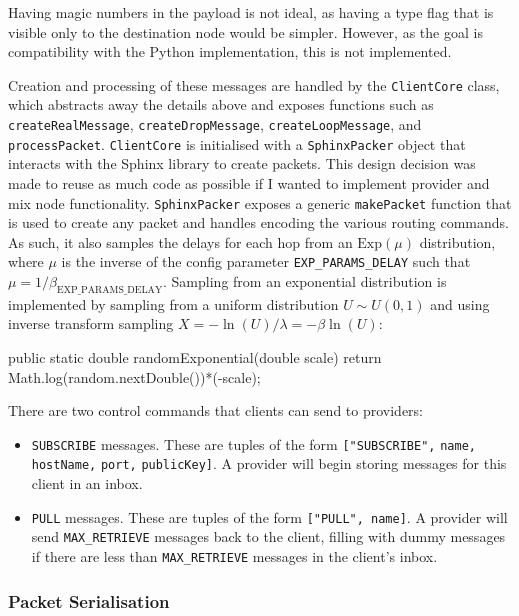 \documentclass[final,dissertation.tex]{subfiles}
\begin{document}
Having magic numbers in the payload is not ideal, as having a type flag that is visible only to the destination node would be simpler. However, as the goal is compatibility with the Python implementation, this is not implemented.

Creation and processing of these messages are handled by the \verb|ClientCore| class, which abstracts away the details above and exposes functions such as \verb|createRealMessage|, \verb|createDropMessage|, \verb|createLoopMessage|, and \verb|processPacket|.  \verb|ClientCore| is initialised with a \verb|SphinxPacker| object that interacts with the Sphinx library to create packets. This design decision was made to reuse as much code as possible if I wanted to implement provider and mix node functionality. \verb|SphinxPacker| exposes a generic \verb|makePacket| function that is used to create any packet and handles encoding the various routing commands. As such, it also samples the delays for each hop from an $\text{Exp}(\mu)$ distribution, where $\mu$ is the inverse of the config parameter \verb|EXP_PARAMS_DELAY| such that $\mu = 1/\beta_\text{EXP\_PARAMS\_DELAY}$. Sampling from an exponential distribution is implemented by sampling from a uniform distribution $U \sim U(0,1)$ and using inverse transform sampling $X = -\ln(U)/\lambda = -\beta\ln(U)$:

\begin{javacode}
public static double randomExponential(double scale) {
    return Math.log(random.nextDouble())*(-scale);
}
\end{javacode}

There are two control commands that clients can send to providers:

\begin{itemize}
	\item \verb|SUBSCRIBE| messages. These are tuples of the form \verb|[|\verb|"SUBSCRIBE",| \verb|name,| \verb|hostName,| \verb|port,| \verb|publicKey|\verb|]|. A provider will begin storing messages for this client in an inbox.
	\item \verb|PULL| messages. These are tuples of the form \verb|["PULL", name]|. A provider will send \verb|MAX_RETRIEVE| messages back to the client, filling with dummy messages if there are less than \verb|MAX_RETRIEVE| messages in the client's inbox.
\end{itemize}

\subsubsection{Packet Serialisation} \label{sec:serialisation}
\end{document}
